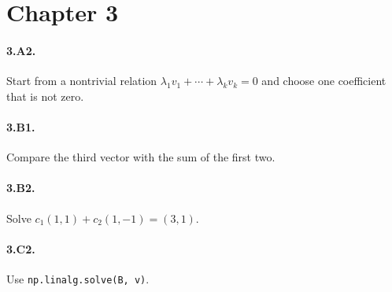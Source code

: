\section*{Chapter 3}

\paragraph{3.A2.}
Start from a nontrivial relation
$\lambda_1v_1+\cdots+\lambda_kv_k=0$ and choose one coefficient that is not
zero.

\paragraph{3.B1.}
Compare the third vector with the sum of the first two.

\paragraph{3.B2.}
Solve $c_1(1,1)+c_2(1,-1)=(3,1)$.

\paragraph{3.C2.}
Use \texttt{np.linalg.solve(B, v)}.
